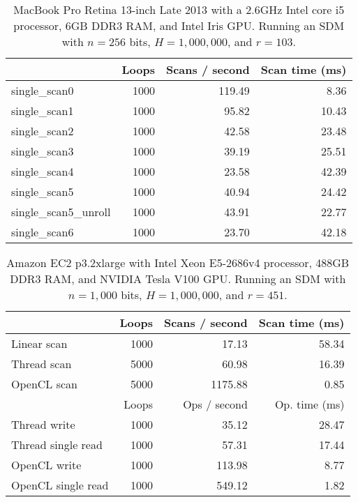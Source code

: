 \begin{table}[!htb]
\centering
\begin{tabular}{| l | r | r | r |}
    \hline
    & Loops & Scans / second & Scan time (ms) \\ \hline
    single\_scan0 & 1000 & 119.49 & 8.36 \\
    single\_scan1 & 1000 & 95.82 & 10.43 \\
    single\_scan2 & 1000 & 42.58 & 23.48 \\
    single\_scan3 & 1000 & 39.19 & 25.51 \\
    single\_scan4 & 1000 & 23.58 & 42.39 \\
    single\_scan5 & 1000 & 40.94 & 24.42 \\
    single\_scan5\_unroll & 1000 & 43.91 & 22.77 \\
    single\_scan6 & 1000 & 23.70 & 42.18 \\
    \hline
\end{tabular}
\caption{MacBook Pro Retina 13-inch Late 2013 with a 2.6GHz Intel core i5 processor, 6GB DDR3 RAM, and Intel Iris GPU. Running an SDM with $n=256$ bits, $H=1,000,000$, and $r=103$.
\label{tab:perf-macbook-kernels-256}}
\end{table}


\begin{table}[!htb]
\centering
\begin{tabular}{| l | r | r | r |}
    \hline
    & Loops & Scans / second & Scan time (ms) \\ \hline
    Linear scan & 1000 & 17.13 & 58.34 \\
    Thread scan & 5000 & 60.98 & 16.39 \\
    OpenCL scan & 5000 & 1175.88 & 0.85 \\ \hline
    \hline
    & Loops & Ops / second & Op. time (ms) \\ \hline
    Thread write & 1000 & 35.12 & 28.47 \\
    Thread single read & 1000 & 57.31 & 17.44 \\
    OpenCL write & 1000 & 113.98 & 8.77 \\
    OpenCL single read & 1000 & 549.12 & 1.82 \\
    \hline
\end{tabular}
\caption{Amazon EC2 p3.2xlarge with Intel Xeon E5-2686v4 processor, 488GB DDR3 RAM, and NVIDIA Tesla V100 GPU. Running an SDM with $n=1,000$ bits, $H=1,000,000$, and $r=451$.}
\end{table}
